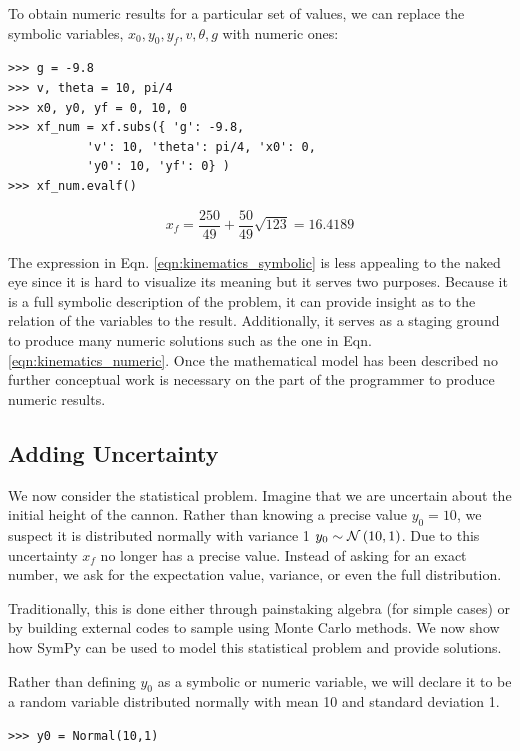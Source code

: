To obtain numeric results for a particular set of values, we can replace the symbolic variables, $x_0, y_0, y_f, v, \theta, g$ with numeric ones:

\begin{lstlisting}
>>> g = -9.8
>>> v, theta = 10, pi/4
>>> x0, y0, yf = 0, 10, 0
>>> xf_num = xf.subs({ 'g': -9.8,
           'v': 10, 'theta': pi/4, 'x0': 0,
           'y0': 10, 'yf': 0} )
>>> xf_num.evalf()
\end{lstlisting}

\begin{equation}
\label{eqn:kinematics_numeric}
x_f = \frac{250}{49} + \frac{50}{49} \sqrt{123} = 16.4189
\end{equation}

The expression in Eqn. \ref{eqn:kinematics_symbolic} is less appealing to the
naked eye since it is hard to visualize its meaning but it serves two
purposes. Because it is a full symbolic description of the problem, it can
provide insight as to the relation of the variables to the
result. Additionally, it serves as a staging ground to produce many numeric
solutions such as the one in Eqn. \ref{eqn:kinematics_numeric}. Once the
mathematical model has been described no further conceptual work is necessary
on the part of the programmer to produce numeric results.

\subsection{Adding Uncertainty}

We now consider the statistical problem. Imagine that we are uncertain about
the initial height of the cannon. Rather than knowing a precise value $y_0 =
10$, we suspect it is distributed normally with variance 1 $y_0 \sim
\mathcal{N}\left(10, 1\right)$. Due to this uncertainty $x_f$ no longer has a precise
value. Instead of asking for an exact number, we ask for the
expectation value, variance, or even the full distribution.

Traditionally, this is done either through painstaking algebra (for simple
cases) or by building external codes to sample using Monte Carlo methods. We
now show how SymPy can be used to model this statistical problem and provide
solutions.

Rather than defining $y_0$ as a symbolic or numeric variable, we will declare
it to be a random variable distributed normally with mean 10 and standard
deviation 1.
\begin{lstlisting}
>>> y0 = Normal(10,1)
\end{lstlisting}

